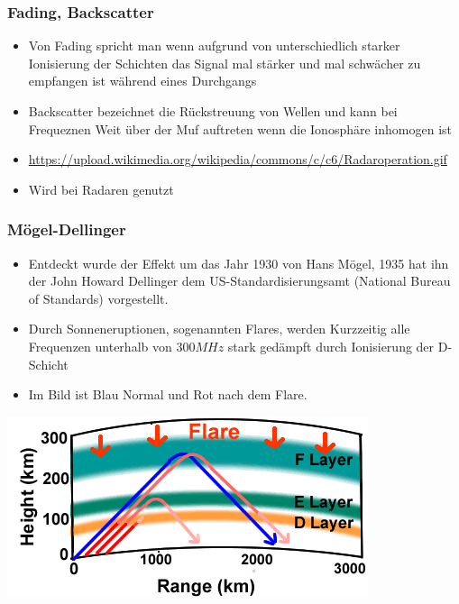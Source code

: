 \begin{frame}
    \frametitle{Fading, Backscatter}
        \begin{center}
    \begin{itemize}
    			\item Von Fading spricht man wenn aufgrund von unterschiedlich starker Ionisierung der Schichten das Signal mal stärker und mal schwächer zu empfangen ist während eines Durchgangs
    			\item Backscatter bezeichnet die Rückstreuung von Wellen und kann bei Frequeznen Weit über der Muf auftreten wenn die Ionosphäre inhomogen ist  			
    			\item \url{https://upload.wikimedia.org/wikipedia/commons/c/c6/Radaroperation.gif}
    			\item Wird bei Radaren genutzt
    \end{itemize}
    \end{center}
\end{frame}

\begin{frame}
    \frametitle{Mögel-Dellinger}
    \begin{center}
    \begin{itemize}
    			\item Entdeckt wurde der Effekt um das Jahr 1930 von Hans Mögel, 1935 hat ihn der John Howard Dellinger dem US-Standardisierungsamt (National Bureau of Standards) vorgestellt.
    			\item Durch Sonneneruptionen, sogenannten Flares, werden Kurzzeitig alle Frequenzen unterhalb von $300MHz$ stark gedämpft durch Ionisierung der D-Schicht
    			\item Im Bild ist Blau Normal und Rot nach dem Flare. \\[1em]
    \end{itemize}
        \includegraphics[width=.6\textwidth]{a08/FlareNPS.png}
    \end{center}
\end{frame}

